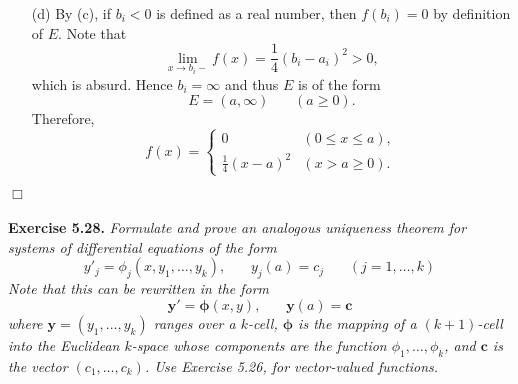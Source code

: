 \documentclass{article}
\begin{document}
\begin{enumerate}
\begin{enumerate}
  \item[(d)]
  By (c), if $b_i < 0$ is defined as a real number,
  then $f(b_i) = 0$ by definition of $E$.
  Note that
  \[
    \lim_{x \to b_i-} f(x) = \frac{1}{4}(b_i - a_i)^2 > 0,
  \]
  which is absurd.
  Hence $b_i = \infty$ and thus $E$ is of the form
  \[
    E = (a,\infty) \:\:\:\:\:\:\:\: (a \geq 0).
  \]
  Therefore,
  \begin{equation*}
  f(x) =
    \begin{cases}
      0                    & (0 \leq x \leq a), \\
      \frac{1}{4}(x - a)^2 & (x > a \geq 0).
    \end{cases}
  \end{equation*}
  \end{enumerate}
\end{enumerate}
$\Box$ \\\\






\textbf{Exercise 5.28.}
\emph{Formulate and prove an analogous uniqueness theorem for
systems of differential equations of the form
\[
  y'_j = \phi_j(x, y_1, \ldots, y_k), \:\:\:\:\:\:\:\:
  y_j(a) = c_j \:\:\:\:\:\:\:\:
  (j = 1, \ldots, k)
\]
Note that this can be rewritten in the form
\[
  \mathbf{y}' = \bm{\phi}(x,y), \:\:\:\:\:\:\:\:
  \mathbf{y}(a) = \mathbf{c}
\]
where $\mathbf{y} = (y_1, ..., y_k)$ ranges over a $k$-cell,
$\bm{\phi}$ is the mapping of a $(k+1)$-cell into the Euclidean $k$-space
whose components are the function $\phi_1, \ldots, \phi_k$,
and $\mathbf{c}$ is the vector $(c_1, \ldots, c_k)$.
Use Exercise 5.26, for vector-valued functions.} \\
\end{document}
